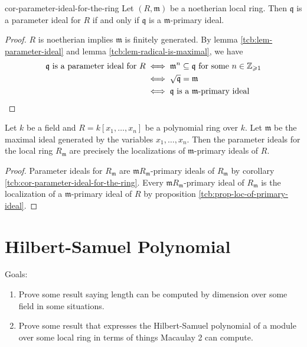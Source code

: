 \documentclass[a4paper,10pt]{article}
\theoremstyle{definition}
\newcommand\lref[2][blue!60!black]{lemma \ref{tcb:#2}}
\newcommand\cref[2][blue!60!black]{corollary \ref{tcb:#2}}
\newcommand\pref[2][blue!60!black]{proposition \ref{tcb:#2}}
\renewcommand\geq{\geqslant}
\begin{document}
\begin{corollary}{}{cor-parameter-ideal-for-the-ring}
Let $(R,\mathfrak{m})$ be a noetherian local ring.
Then $\mathfrak{q}$ is a parameter ideal for $R$ 
if and only if $\mathfrak{q}$ is a $\mathfrak{m}$-primary ideal.
\end{corollary}
\begin{proof}
$R$ is noetherian implies $\mathfrak{m}$ is finitely generated.
By \lref{lem-parameter-ideal} and \lref{lem-radical-is-maximal}, we have
\begin{equation*}\begin{split}
\mathfrak{q}\text{ is a parameter ideal for }R
&\iff\mathfrak{m}^n\subseteq\mathfrak{q}\text{ for some }n\in\mathbb{Z}_{\geq1}\\
&\iff\sqrt{\mathfrak{q}}=\mathfrak{m}\\
&\iff\mathfrak{q}\text{ is a }\mathfrak{m}\text{-primary ideal}\qedhere
\end{split}\end{equation*}
\end{proof}

\begin{corollary}{}{}
Let $k$ be a field and $R=k[x_1,\dots,x_n]$ be a polynomial ring over $k$.
Let $\mathfrak{m}$ be the maximal ideal 
generated by the variables $x_1,\dots,x_n$.
Then the parameter ideals for the local ring $R_{\mathfrak{m}}$ are precisely
the localizations of $\mathfrak{m}$-primary ideals of $R$.
\end{corollary}
\begin{proof}
Parameter ideals for $R_{\mathfrak{m}}$ are 
$\mathfrak{m}R_{\mathfrak{m}}$-primary ideals of $R_{\mathfrak{m}}$
by \cref{cor-parameter-ideal-for-the-ring}.
Every $\mathfrak{m}R_{\mathfrak{m}}$-primary ideal of $R_{\mathfrak{m}}$ is
the localization of a $\mathfrak{m}$-primary ideal of $R$ 
by \pref{prop-loc-of-primary-ideal}.
\end{proof}

\section{Hilbert-Samuel Polynomial}

Goals:
\begin{enumerate}[label=(\arabic*)]
\item
Prove some result saying length can be computed by dimension over 
some field in some situations.
\item
Prove some result that expresses the Hilbert-Samuel polynomial 
of a module over some local ring in terms of things Macaulay 2 can compute.
\end{enumerate}

\pagebreak

\printindex
\hypertarget{index}{}
{}
\end{document}
